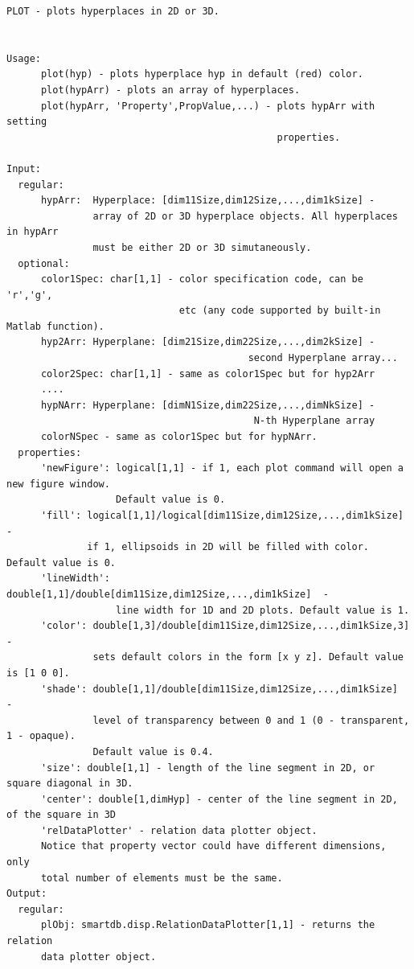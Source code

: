 \documentclass[letterpaper,10pt,english]{sphinxmanual}
\begin{document}
\begin{Verbatim}[commandchars=\\\{\}]
PLOT - plots hyperplaces in 2D or 3D.


Usage:
      plot(hyp) - plots hyperplace hyp in default (red) color.
      plot(hypArr) - plots an array of hyperplaces.
      plot(hypArr, 'Property',PropValue,...) - plots hypArr with setting
                                               properties.

Input:
  regular:
      hypArr:  Hyperplace: [dim11Size,dim12Size,...,dim1kSize] -
               array of 2D or 3D hyperplace objects. All hyperplaces in hypArr
               must be either 2D or 3D simutaneously.
  optional:
      color1Spec: char[1,1] - color specification code, can be 'r','g',
                              etc (any code supported by built-in Matlab function).
      hyp2Arr: Hyperplane: [dim21Size,dim22Size,...,dim2kSize] -
                                          second Hyperplane array...
      color2Spec: char[1,1] - same as color1Spec but for hyp2Arr
      ....
      hypNArr: Hyperplane: [dimN1Size,dim22Size,...,dimNkSize] -
                                           N-th Hyperplane array
      colorNSpec - same as color1Spec but for hypNArr.
  properties:
      'newFigure': logical[1,1] - if 1, each plot command will open a new figure window.
                   Default value is 0.
      'fill': logical[1,1]/logical[dim11Size,dim12Size,...,dim1kSize]  -
              if 1, ellipsoids in 2D will be filled with color. Default value is 0.
      'lineWidth': double[1,1]/double[dim11Size,dim12Size,...,dim1kSize]  -
                   line width for 1D and 2D plots. Default value is 1.
      'color': double[1,3]/double[dim11Size,dim12Size,...,dim1kSize,3] -
               sets default colors in the form [x y z]. Default value is [1 0 0].
      'shade': double[1,1]/double[dim11Size,dim12Size,...,dim1kSize]  -
               level of transparency between 0 and 1 (0 - transparent, 1 - opaque).
               Default value is 0.4.
      'size': double[1,1] - length of the line segment in 2D, or square diagonal in 3D.
      'center': double[1,dimHyp] - center of the line segment in 2D, of the square in 3D
      'relDataPlotter' - relation data plotter object.
      Notice that property vector could have different dimensions, only
      total number of elements must be the same.
Output:
  regular:
      plObj: smartdb.disp.RelationDataPlotter[1,1] - returns the relation
      data plotter object.
\end{Verbatim}
\end{document}
